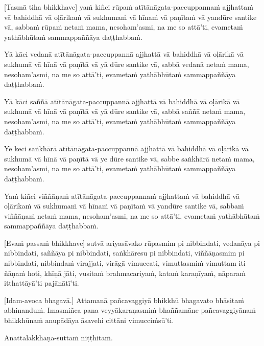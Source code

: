 [Tasmā tiha bhikkhave] yaṁ kiñci rūpaṁ atītānāgata-paccuppannaṁ ajjhattaṁ
vā bahiddhā vā oḷārikaṁ vā sukhumaṁ vā hīnaṁ vā paṇītaṁ vā yandūre
santike vā, sabbaṁ rūpaṁ netaṁ mama, nesoham'asmi, na me so attā'ti,
evametaṁ yathābhūtaṁ sammappaññāya daṭṭhabbaṁ.

Yā kāci vedanā atītānāgata-paccuppannā ajjhattā vā bahiddhā vā oḷārikā
vā sukhumā vā hīnā vā paṇītā vā yā dūre santike vā, sabbā vedanā netaṁ
mama, nesoham'asmi, na me so attā'ti, evametaṁ yathābhūtaṁ sammappaññāya
daṭṭhabbaṁ.

Yā kāci saññā atītānāgata-paccuppannā ajjhattā vā bahiddhā vā oḷārikā vā
sukhumā vā hīnā vā paṇītā vā yā dūre santike vā, sabbā saññā netaṁ mama,
nesoham'asmi, na me so attā'ti, evametaṁ yathābhūtaṁ sammappaññāya
daṭṭhabbaṁ.

Ye keci saṅkhārā atītānāgata-paccuppannā ajjhattā vā bahiddhā vā oḷārikā
vā sukhumā vā hīnā vā paṇītā vā ye dūre santike vā, sabbe saṅkhārā netaṁ
mama, nesoham'asmi, na me so attā'ti, evametaṁ yathābhūtaṁ sammappaññāya
daṭṭhabbaṁ.

Yaṁ kiñci viññāṇaṁ atītānāgata-paccuppannaṁ ajjhattaṁ vā bahiddhā vā
oḷārikaṁ vā sukhumaṁ vā hīnaṁ vā paṇītaṁ vā yandūre santike vā, sabbaṁ
viññāṇaṁ netaṁ mama, nesoham'asmi, na me so attā'ti, evametaṁ yathābhūtaṁ
sammappaññāya daṭṭhabbaṁ.

[Evaṁ passaṁ bhikkhave] sutvā ariyasāvako rūpasmim pi nibbindati, vedanāya
pi nibbindati, saññāya pi nibbindati, saṅkhāresu pi nibbindati,
viññāṇasmim pi nibbindati, nibbindaṁ virajjati, virāgā vimuccati,
vimuttasmiṁ vimuttam iti ñāṇaṁ hoti, khīṇā jāti, vusitaṁ brahmacariyaṁ,
kataṁ karaṇīyaṁ, nāparaṁ itthattāyā'ti pajānātī'ti.

[Idam-avoca bhagavā.] Attamanā pañcavaggiyā bhikkhū bhagavato bhāsitaṁ
abhinanduṁ. Imasmiñca pana veyyākaraṇasmiṁ bhaññamāne pañcavaggiyānaṁ
bhikkhūnaṁ anupādāya āsavehi cittāni vimucciṁsū'ti.

Anattalakkhaṇa-suttaṁ niṭṭhitaṁ.


